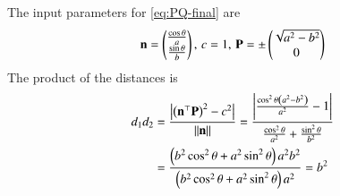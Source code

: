 The input parameters for 
			\eqref{eq:PQ-final}
			are
\begin{align}
	\mathbf{n}=\begin{pmatrix}\frac{\cos{\theta}}{a}  \\ \frac{\sin{\theta}}{b}\end{pmatrix},\,
  c = 1,\,
	\mathbf{P} =\pm \begin{pmatrix}\sqrt{a^2-b^2}\\0\end{pmatrix} 
\end{align} 
The product of the distances is
\begin{align}
	d_1d_2 &=\frac{\left\vert \left(\mathbf{n}^{\top} \mathbf{P}\right)^2 -  c^2 \right\vert }{\left\lVert\mathbf{n}\right\rVert}
	=\frac{\left\vert \frac{\cos^2{\theta}\left(a^2-b^2\right)}{a^2}- 1 \right\vert}{\frac{\cos^2{\theta}}{a^2} +\frac{\sin^2{\theta}}{b^2} }\\ 
	&= \frac{\left(b^2 \cos^2{\theta} + a^2 \sin^2{\theta}\right)a^2 b^2}{\left(b^2 \cos^2{\theta} + a^2 \sin^2{\theta}\right)a^2}
	= b^2
\end{align}
